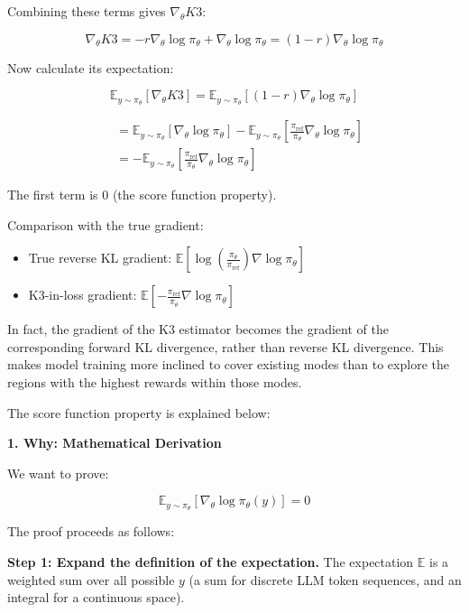 Combining these terms gives \(\nabla_\theta K3\):

\[
\nabla_\theta K3
=-r\nabla_\theta\log\pi_\theta+\nabla_\theta\log\pi_\theta
=(1-r)\nabla_\theta\log\pi_\theta
\]

Now calculate its expectation:

\[
\mathbb{E}_{y\sim\pi_\theta}[\nabla_\theta K3]
=\mathbb{E}_{y\sim\pi_\theta}\left[(1-r)\nabla_\theta\log\pi_\theta\right]
\]

\[
\begin{aligned}
&=\mathbb{E}_{y\sim\pi_\theta}\left[\nabla_\theta\log\pi_\theta\right]
-\mathbb{E}_{y\sim\pi_\theta}\left[
\frac{\pi_{\mathrm{ref}}}{\pi_\theta}\nabla_\theta\log\pi_\theta
\right] \\
&=-\mathbb{E}_{y\sim\pi_\theta}\left[
\frac{\pi_{\mathrm{ref}}}{\pi_\theta}\nabla_\theta\log\pi_\theta
\right]
\end{aligned}
\]

The first term is \(0\) (the score function property).

Comparison with the true gradient:

\begin{itemize}
\tightlist
\item
  True reverse KL gradient: \(\mathbb{E}\left[\log\left(\frac{\pi_\theta}{\pi_{\mathrm{ref}}}\right)\nabla\log\pi_\theta\right]\)
\item
  K3-in-loss gradient: \(\mathbb{E}\left[-\frac{\pi_{\mathrm{ref}}}{\pi_\theta}\nabla\log\pi_\theta\right]\)
\end{itemize}

In fact, the gradient of the K3 estimator becomes the gradient of the corresponding forward KL divergence, rather than reverse KL divergence. This makes model training more inclined to cover existing modes than to explore the regions with the highest rewards within those modes.

The score function property is explained below:

\textbf{1. Why: Mathematical Derivation}

We want to prove:

\[
\mathbb{E}_{y\sim\pi_\theta}\left[\nabla_\theta\log\pi_\theta(y)\right]=0
\]

The proof proceeds as follows:

\textbf{Step 1: Expand the definition of the expectation.} The expectation \(\mathbb{E}\) is a weighted sum over all possible \(y\) (a sum for discrete LLM token sequences, and an integral for a continuous space).


